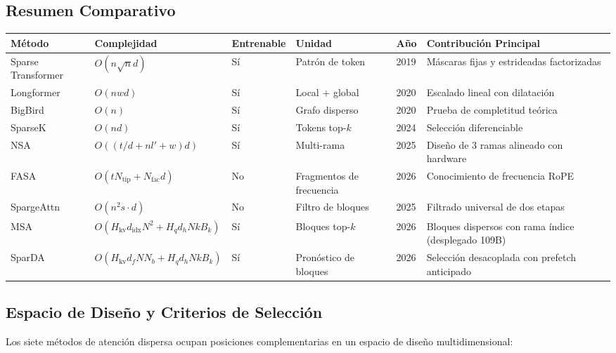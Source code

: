 \subsection{Resumen Comparativo}

\footnotesize
\begin{longtable}{p{1.9cm}p{1.7cm}p{1.6cm}p{1.6cm}p{1.1cm}p{3.5cm}}
\toprule
\textbf{Método} & \textbf{Complejidad} & \textbf{Entrenable} & \textbf{Unidad} & \textbf{Año} & \textbf{Contribución Principal} \\
\midrule
\endhead
Sparse Transformer & $O(n\sqrt{n}d)$ & Sí & Patrón de token & 2019 & Máscaras fijas y estrideadas factorizadas \\
Longformer & $O(nwd)$ & Sí & Local + global & 2020 & Escalado lineal con dilatación \\
BigBird & $O(n)$ & Sí & Grafo disperso & 2020 & Prueba de completitud teórica \\
SparseK & $O(nd)$ & Sí & Tokens top-$k$ & 2024 & Selección diferenciable \\
NSA & $O((t/d+nl'+w)d)$ & Sí & Multi-rama & 2025 & Diseño de 3 ramas alineado con hardware \\
FASA & $O(tN_{\text{tip}}+N_{\text{fac}}d)$ & No & Fragmentos de frecuencia & 2026 & Conocimiento de frecuencia RoPE \\
SpargeAttn & $O(n^2 s \cdot d)$ & No & Filtro de bloques & 2025 & Filtrado universal de dos etapas \\
MSA & $O(H_{\text{kv}}d_{\text{idx}}N^2 + H_q d_h N k B_k)$ & Sí & Bloques top-$k$ & 2026 & Bloques dispersos con rama índice (desplegado 109B) \\
SparDA & $O(H_{\text{kv}}d_f N N_b + H_q d_h N k B_k)$ & Sí & Pronóstico de bloques & 2026 & Selección desacoplada con prefetch anticipado \\
\bottomrule
\end{longtable}
\normalsize

\subsection{Espacio de Diseño y Criterios de Selección}

Los siete métodos de atención dispersa ocupan posiciones complementarias en un espacio de diseño multidimensional:

